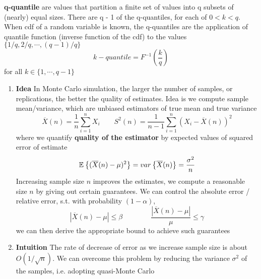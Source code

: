 \documentclass[11pt]{article}
\begin{document}
\begin{defn*}
    \textbf{q-quantile} are values that partition a finite set of values into q subsets of (nearly) equal sizes. There are q - 1 of the q-quantiles, for each of $0 < k < q$. When cdf of a random variable is known, the q-quantiles are the application of quantile function (inverse function of the cdf) to the values $\{ 1/q, 2/q, \cdots, (q-1)/q \}$
    \[
        k-quantile = F^{-1}\left(\frac{k}{q}\right)
    \]
    for all $k \in \{1, \cdots, q-1\}$
\end{defn*}



\begin{enumerate}
    \item \textbf{Idea} In Monte Carlo simulation, the larger the number of samples, or replications, the better the quality of estimates. Idea is we compute sample mean/variance, which are unbiased estimators of true mean and true variance
    \[
        \overline{X}(n) = \frac{1}{n} \sum_{i=1}^n X_i
        \qquad 
        S^2(n) = \frac{1}{n-1} \sum_{i=1}^n (X_i - \overline{X}(n))^2
    \]
    where we quantify \textbf{quality of the estimator} by expected values of squared error of estimate 
    \[
        \mathbb{E}_{}\left\{(\overline{X}(n) - \mu)^2\right\} = var_{}\left\{\overline{X}(n)\right\} = \frac{\sigma^2}{n}
    \]  
    Increasing sample size $n$ improves the estimates, we compute a reasonable size $n$ by giving out certain guarantees. We can control the absolute error / relative error, s.t. with probability $(1-\alpha)$, 
    \[
        |\overline{X}(n) - \mu | \leq \beta 
        \qquad 
        \qquad 
        \frac{|\overline{X}(n) - \mu | }{\mu} \leq \gamma
    \]
    we can then derive the appropriate bound to achieve such guarantees
    \item \textbf{Intuition} The rate of decrease of error as we increase sample size is about $O(1 / \sqrt{n})$. We can overcome this problem by reducing the variance $\sigma^2$ of the samples, i.e. adopting quasi-Monte Carlo 
\end{enumerate}



\end{document}
